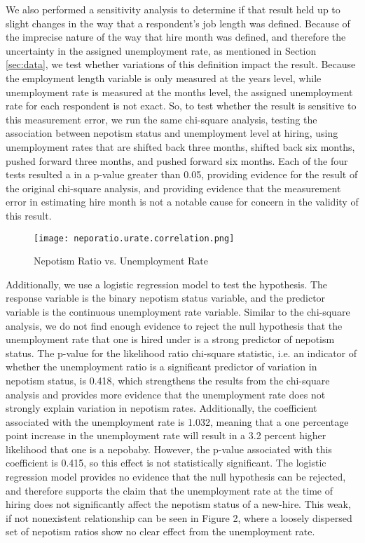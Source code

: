 \documentclass[12pt]{article}
\begin{document}
We also performed a sensitivity analysis to determine if that result held up to slight changes in the way that a respondent's job length was defined. Because of the imprecise nature of the way that hire month was defined, and therefore the uncertainty in the assigned unemployment rate, as mentioned in Section \ref{sec:data}, we test whether variations of this definition impact the result. Because the employment length variable is only measured at the years level, while unemployment rate is measured at the months level, the assigned unemployment rate for each respondent is not exact. So, to test whether the result is sensitive to this measurement error, we run the same chi-square analysis, testing the association between nepotism status and unemployment level at hiring, using unemployment rates that are shifted back three months, shifted back six months, pushed forward three months, and pushed forward six months. Each of the four tests resulted a in a p-value greater than 0.05, providing evidence for the result of the original chi-square analysis, and providing evidence that the measurement error in estimating hire month is not a notable cause for concern in the validity of this result.

\begin{figure}
    \centering
    \texttt{[image: neporatio.urate.correlation.png]}
    \caption{Nepotism Ratio vs. Unemployment Rate}
    \label{fig:enter-label}
\end{figure}

Additionally, we use a logistic regression model to test the hypothesis. The response variable is the binary nepotism status variable, and the predictor variable is the continuous unemployment rate variable. Similar to the chi-square analysis, we do not find enough evidence to reject the null hypothesis that the unemployment rate that one is hired under is a strong predictor of nepotism status. The p-value for the likelihood ratio chi-square statistic, i.e. an indicator of whether the unemployment ratio is a significant predictor of variation in nepotism status, is 0.418, which strengthens the results from the chi-square analysis and provides more evidence that the unemployment rate does not strongly explain variation in nepotism rates. Additionally, the coefficient associated with the unemployment rate is 1.032, meaning that a one percentage point increase in the unemployment rate will result in a 3.2 percent higher likelihood that one is a nepobaby. However, the p-value associated with this coefficient is 0.415, so this effect is not statistically significant. The logistic regression model provides no evidence that the null hypothesis can be rejected, and therefore supports the claim that the unemployment rate at the time of hiring does not significantly affect the nepotism status of a new-hire. This weak, if not nonexistent relationship can be seen in Figure 2, where a loosely dispersed set of nepotism ratios show no clear effect from the unemployment rate.
\end{document}
